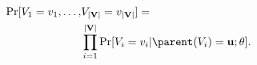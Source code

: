 	\begin{equation}
		\begin{split}
				\Pr[V_1=v_1, \dots, &V_{|\mathbf{V}|}=v_{|\mathbf{V}|}] = \\ 
			&\prod_{i=1}^{|\mathbf{V}|} \Pr[V_i = v_i | \parent(V_i) = \mathbf{u}; \theta].
		\end{split}
	\label{fvgm_eq:BN}
	\end{equation}

	\iffalse	
	$ \factors $ contains a factor $ \factor $ representing a function over the  assignment or valuation of  $ \{V_i\} \cup \parent(V_i)  $. Let $ v $ and $ \mathbf{u} $ denote an assignment of $ V_i $ and $ \parent(V_i) $, respectively. 	Formally a factor $ \factor(V_i = v, \parent(V_i) = \mathbf{u}) \triangleq  \Pr[V_i = v | \parent(V_i) = \mathbf{u}] $ denotes the conditional probability of $ V_i = v $ given $ \parent(V_i) = \mathbf{u} $. Avoiding notation clutter, we drop $ v $ and $ \mathbf{u} $ and use $ \factor(V_i, \parent(V_i)) \triangleq  \Pr[V_i| \parent(V_i)] $, when it is clear from the context.
	\fi
	